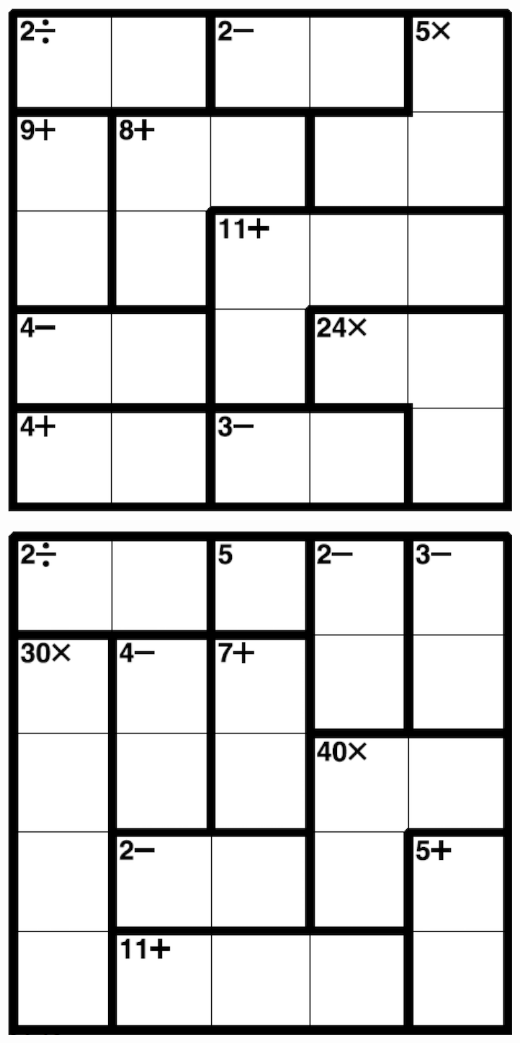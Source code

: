 
\includegraphics[scale=1]{Gambar/Lampiran/5x5_7.png}

\includegraphics[scale=1]{Gambar/Lampiran/5x5_8.png}

